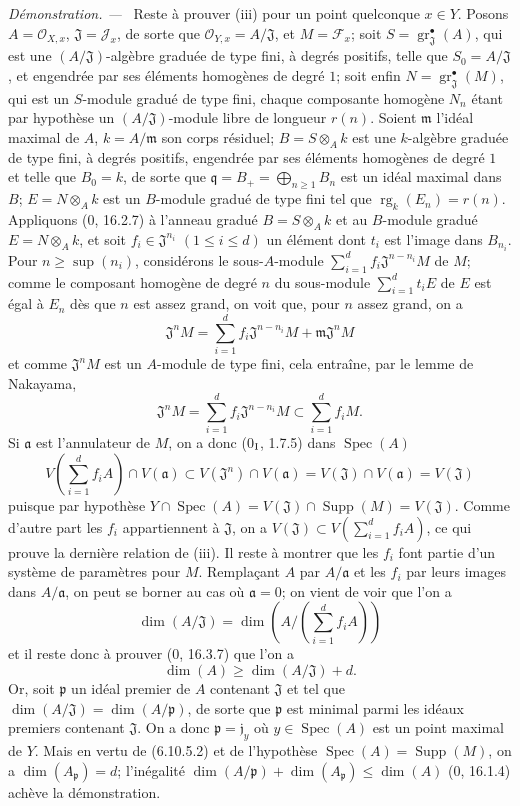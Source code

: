 \documentclass[10pt,oneside]{book}
\newenvironment{proof}{%
  \par\medskip\noindent\textit{Démonstration. ---\ }}{\par}
\begin{document}
\begin{proof}
Reste à prouver (iii) pour un point quelconque $x\in Y$. Posons
$A=\mathcal O_{X,x}$, $\mathfrak J=\mathcal J_x$, de sorte que
$\mathcal O_{Y,x}=A/\mathfrak J$, et $M=\mathcal F_x$; soit
$S=\operatorname{gr}_{\mathfrak J}^{\bullet}(A)$, qui est une
$(A/\mathfrak J)$-algèbre graduée de type fini, à degrés positifs, telle
que $S_0=A/\mathfrak J$, et engendrée par ses éléments homogènes de degré
$1$; soit enfin
$N=\operatorname{gr}_{\mathfrak J}^{\bullet}(M)$, qui est un $S$-module
gradué de type fini, chaque composante homogène $N_n$ étant par hypothèse
un $(A/\mathfrak J)$-module libre de longueur $r(n)$. Soient $\mathfrak m$
l'idéal maximal de $A$, $k=A/\mathfrak m$ son corps résiduel;
$B=S\otimes_A k$ est une $k$-algèbre graduée de type fini, à degrés
positifs, engendrée par ses éléments homogènes de degré $1$ et telle que
$B_0=k$, de sorte que $\mathfrak q=B_+=\bigoplus_{n\geq1}B_n$ est un idéal
maximal dans $B$; $E=N\otimes_A k$ est un $B$-module gradué de type fini
tel que $\operatorname{rg}_k(E_n)=r(n)$. Appliquons (0, 16.2.7) à l'anneau
gradué $B=S\otimes_A k$ et au $B$-module gradué $E=N\otimes_A k$, et soit
$f_i\in\mathfrak J^{n_i}$ $(1\leq i\leq d)$ un élément dont $t_i$ est
l'image dans $B_{n_i}$. Pour $n\geq\sup(n_i)$, considérons le sous-$A$-module
$\sum_{i=1}^{d}f_i\mathfrak J^{n-n_i}M$ de $M$; comme le composant homogène
de degré $n$ du sous-module $\sum_{i=1}^{d}t_iE$ de $E$ est égal à
$E_n$ dès que $n$ est assez grand, on voit que, pour $n$ assez grand, on a
\[
\mathfrak J^nM=\sum_{i=1}^{d}f_i\mathfrak J^{n-n_i}M+
\mathfrak m\mathfrak J^nM
\]
et comme $\mathfrak J^nM$ est un $A$-module de type fini, cela entraîne,
par le lemme de Nakayama,
\[
\mathfrak J^nM=\sum_{i=1}^{d}f_i\mathfrak J^{n-n_i}M
\subset\sum_{i=1}^{d}f_iM.
\]
Si $\mathfrak a$ est l'annulateur de $M$, on a donc (0$_{\rm I}$, 1.7.5)
dans $\operatorname{Spec}(A)$
\[
V\left(\sum_{i=1}^{d}f_iA\right)\cap V(\mathfrak a)
\subset V(\mathfrak J^n)\cap V(\mathfrak a)
=V(\mathfrak J)\cap V(\mathfrak a)=V(\mathfrak J)
\]
puisque par hypothèse
$Y\cap\operatorname{Spec}(A)=V(\mathfrak J)\cap\operatorname{Supp}(M)
=V(\mathfrak J)$. Comme d'autre part les $f_i$ appartiennent à
$\mathfrak J$, on a
$V(\mathfrak J)\subset V(\sum_{i=1}^{d}f_iA)$, ce qui prouve la dernière
relation de (iii). Il reste à montrer que les $f_i$ font partie d'un système
de paramètres pour $M$. Remplaçant $A$ par $A/\mathfrak a$ et les $f_i$ par
leurs images dans $A/\mathfrak a$, on peut se borner au cas où
$\mathfrak a=0$; on vient de voir que l'on a
\[
\dim(A/\mathfrak J)=
\dim\left(A/\left(\sum_{i=1}^{d}f_iA\right)\right)
\]
et il reste donc à prouver (0, 16.3.7) que l'on a
\[
\dim(A)\geq\dim(A/\mathfrak J)+d.
\]
Or, soit $\mathfrak p$ un idéal premier de $A$ contenant $\mathfrak J$ et
tel que $\dim(A/\mathfrak J)=\dim(A/\mathfrak p)$, de sorte que
$\mathfrak p$ est minimal parmi les idéaux premiers contenant
$\mathfrak J$. On a donc $\mathfrak p=\mathfrak j_y$ où
$y\in\operatorname{Spec}(A)$ est un point maximal de $Y$. Mais en vertu de
(6.10.5.2) et de l'hypothèse
$\operatorname{Spec}(A)=\operatorname{Supp}(M)$, on a
$\dim(A_{\mathfrak p})=d$; l'inégalité
$\dim(A/\mathfrak p)+\dim(A_{\mathfrak p})\leq\dim(A)$ (0, 16.1.4)
achève la démonstration.
\end{proof}
\end{document}

